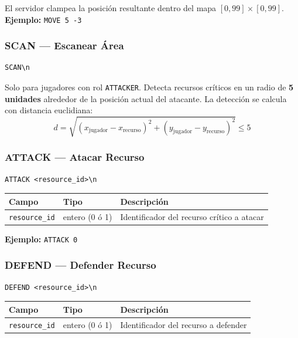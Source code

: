 \documentclass[12pt, letterpaper]{article}
\begin{document}
El servidor clampea la posición resultante dentro del mapa $[0, 99] \times [0, 99]$. \\
\textbf{Ejemplo:} \texttt{MOVE 5 -3}

\subsubsection{SCAN --- Escanear Área}

\begin{lstlisting}
SCAN\n
\end{lstlisting}

Solo para jugadores con rol \texttt{ATTACKER}. Detecta recursos críticos en un radio de \textbf{5 unidades} alrededor de la posición actual del atacante. La detección se calcula con distancia euclidiana:
\[
    d = \sqrt{(x_\text{jugador} - x_\text{recurso})^2 + (y_\text{jugador} - y_\text{recurso})^2} \leq 5
\]

\subsubsection{ATTACK --- Atacar Recurso}

\begin{lstlisting}
ATTACK <resource_id>\n
\end{lstlisting}

\begin{table}[H]
\centering
\begin{tabularx}{\textwidth}{l l X}
\toprule
\textbf{Campo} & \textbf{Tipo} & \textbf{Descripción} \\
\midrule
\texttt{resource\_id} & entero (0 ó 1) & Identificador del recurso crítico a atacar \\
\bottomrule
\end{tabularx}
\end{table}

\textbf{Ejemplo:} \texttt{ATTACK 0}

\subsubsection{DEFEND --- Defender Recurso}

\begin{lstlisting}
DEFEND <resource_id>\n
\end{lstlisting}

\begin{table}[H]
\centering
\begin{tabularx}{\textwidth}{l l X}
\toprule
\textbf{Campo} & \textbf{Tipo} & \textbf{Descripción} \\
\midrule
\texttt{resource\_id} & entero (0 ó 1) & Identificador del recurso a defender \\
\bottomrule
\end{tabularx}
\end{table}
\end{document}
